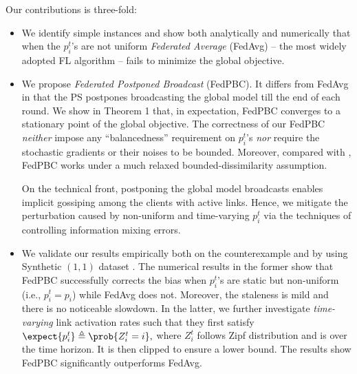 \documentclass[letterpaper, 10 pt, conference]{ieeeconf}  %
\begin{document}
\baselineskip 
{} 
Our contributions is three-fold: 
\begin{itemize}
\item We identify simple instances and show both analytically and numerically that when the $p_i^t$'s are not uniform {\em Federated Average} (FedAvg) -- the most widely adopted FL algorithm -- fails to minimize the global objective.
\item We propose {\em Federated Postponed Broadcast} (FedPBC). %
It differs from FedAvg in that the PS postpones broadcasting the global model till the end of each round. 
We show in Theorem 1 that, in expectation, FedPBC converges to a stationary point of the global objective. %
The correctness of our FedPBC 
{\em neither} impose any ``balancedness'' requirement on $p_i^t$'s {\em nor} require the stochastic gradients or their noises to be bounded. Moreover, compared with \cite{gu2021fast,wang2022}, FedPBC works under a much relaxed bounded-dissimilarity assumption. 



On the technical front, %
postponing the global model broadcasts enables implicit gossiping among the clients with active links.  
Hence, we mitigate the perturbation %
caused by non-uniform and time-varying $p_i^t$ via the techniques of controlling information mixing errors. %
 


\item We validate our results empirically both on the counterexample and by using Synthetic $(1,1)$ dataset \cite{li2020federated}.
    The numerical results in the former show that FedPBC successfully corrects the bias when $p_i^t$'s are static but non-uniform (i.e., $p_i^t = p_i$) %
    while FedAvg does not. Moreover, the staleness is mild and there is no noticeable slowdown.
    In the latter, we further investigate {\it time-varying} link activation rates such that they first satisfy $\expect{p_i^t}\triangleq \prob{Z_i^t = i},$ 
    where $Z_i^t$ follows Zipf distribution and is \iid over the time horizon. 
    It is then clipped to ensure a lower bound.
    The results show FedPBC significantly outperforms FedAvg.
\end{itemize}
\end{document}

